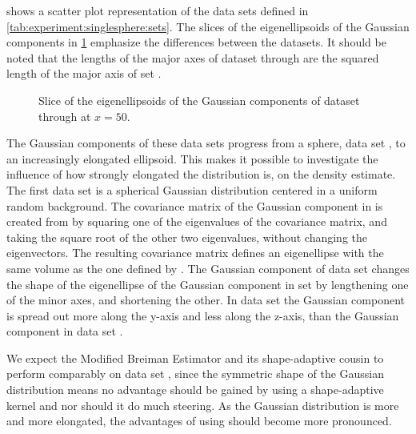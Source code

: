 
 shows a scatter plot representation of the data sets defined in \cref{tab:experiment:singlesphere:sets}. The slices of the eigenellipsoids of the Gaussian components in \cref{fig:experiment:singlesphere:projection} emphasize the differences between the datasets. It should be noted that the lengths of the major axes of dataset \baakmanOne through \baakmanFive are the squared length of the major axis of set \ferdosiOne. 

\begin{figure}[b!]
	\centering
	
	\caption{Slice of the eigenellipsoids of the Gaussian components of  dataset \ferdosiOne through  \baakmanFive at $x = 50$.}
	\label{fig:experiment:singlesphere:projection}
\end{figure}

The Gaussian components of these data sets progress from a sphere, \ie data set \ferdosiOne, to an increasingly elongated ellipsoid. This makes it possible to investigate the influence of how strongly elongated the distribution is, on the density estimate. 
	The first data set is a spherical Gaussian distribution centered in a uniform random background. 
	The covariance matrix of the Gaussian component in \baakmanOne is created from \ferdosiOne by squaring one of the eigenvalues of the covariance matrix, and taking the square root of the other two eigenvalues, without changing the eigenvectors. The resulting covariance matrix defines an eigenellipse with the same volume as the one defined by \ferdosiOne.
	The Gaussian component of data set \baakmanFour changes the shape of the eigenellipse of the Gaussian component in set \ferdosiOne by lengthening one of the minor axes, and shortening the other.
	In data set \baakmanFive the Gaussian component is spread out more along the y-axis and less along the z-axis, than the Gaussian component in data set \baakmanFour.

	We expect the Modified Breiman Estimator and its shape-adaptive cousin to perform comparably on data set \ferdosiOne, since the symmetric shape of the Gaussian distribution means no advantage should be gained by using a shape-adaptive kernel and nor should it do much steering. 
	As the Gaussian distribution is more and more elongated, the advantages of using \sambe should become more pronounced. 